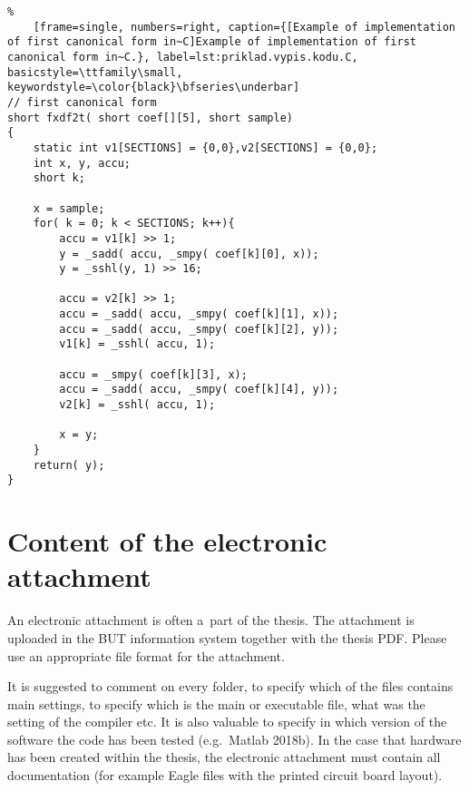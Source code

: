\noindent
\begin{minipage}{\linewidth}



\begin{lstlisting}%
	[frame=single, numbers=right, caption={[Example of implementation of first canonical form in~C]Example of implementation of first canonical form in~C.}, label=lst:priklad.vypis.kodu.C, basicstyle=\ttfamily\small, keywordstyle=\color{black}\bfseries\underbar]
// first canonical form
short fxdf2t( short coef[][5], short sample)
{
	static int v1[SECTIONS] = {0,0},v2[SECTIONS] = {0,0};
	int x, y, accu;
	short k;

	x = sample;
	for( k = 0; k < SECTIONS; k++){
		accu = v1[k] >> 1;
		y = _sadd( accu, _smpy( coef[k][0], x));
		y = _sshl(y, 1) >> 16;

		accu = v2[k] >> 1;
		accu = _sadd( accu, _smpy( coef[k][1], x));
		accu = _sadd( accu, _smpy( coef[k][2], y));
		v1[k] = _sshl( accu, 1);

		accu = _smpy( coef[k][3], x);
		accu = _sadd( accu, _smpy( coef[k][4], y));
		v2[k] = _sshl( accu, 1);

		x = y;
	}
	return( y);
}
\end{lstlisting}
\end{minipage}







\chapter{Content of the electronic attachment}
An electronic attachment is often a~part of the thesis.
The attachment is uploaded in the BUT information system together with the thesis PDF.
Please use an appropriate file format for the attachment.

It is suggested to comment on every folder, to specify which of the files contains main settings,
to specify which is the main or executable file, what was the setting of the compiler etc.
It is also valuable to specify in which version of the software the code has been tested (e.g.\ Matlab 2018b).
In the case that hardware has been created within the thesis, the electronic attachment must contain all documentation
(for example Eagle files with the printed circuit board layout).

